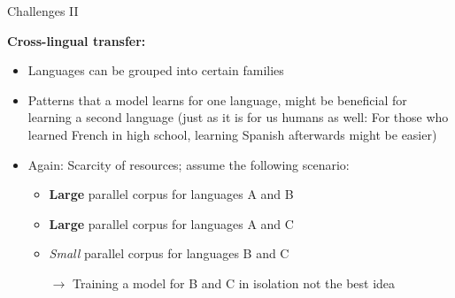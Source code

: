 \begin{vbframe}{Challenges II}

\vfill

\textbf{Cross-lingual transfer:}

\begin{itemize}
	\item Languages can be grouped into certain families
	\item Patterns that a model learns for one language, might be beneficial for learning a second language 
				(just as it is for us humans as well: For those who learned French in high school, learning Spanish
				afterwards might be easier)
	\item Again: Scarcity of resources; assume the following scenario:
		\begin{itemize}
			\item \textbf{Large} parallel corpus for languages A and B
			\item \textbf{Large} parallel corpus for languages A and C
			\item \textit{Small} parallel corpus for languages B and C
			\item[$\to$] Training a model for B and C in isolation not the best idea
		\end{itemize}
\end{itemize}

\vfill

\end{vbframe}

\endlecture

